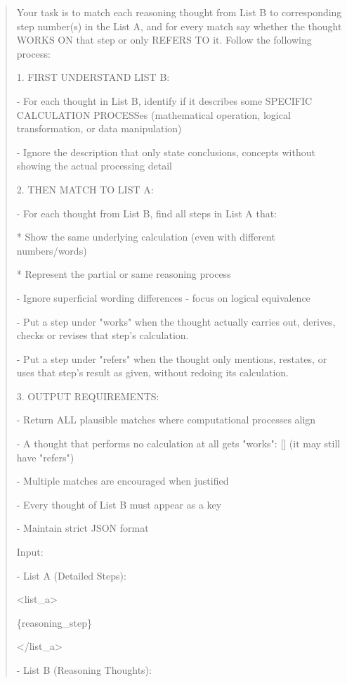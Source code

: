\begin{quote}
\footnotesize\ttfamily\raggedright
Your task is to match each reasoning thought from List B to corresponding step number(s) in the List A, and for every match say whether the thought WORKS ON that step or only REFERS TO it. Follow the following process:\par
1. FIRST UNDERSTAND LIST B:\par
   - For each thought in List B, identify if it describes some SPECIFIC CALCULATION PROCESSes (mathematical operation, logical transformation, or data manipulation)\par
   - Ignore the description that only state conclusions, concepts without showing the actual processing detail\par
2. THEN MATCH TO LIST A:\par
   - For each thought from List B, find all steps in List A that:\par
     * Show the same underlying calculation (even with different numbers/words)\par
     * Represent the partial or same reasoning process\par
   - Ignore superficial wording differences - focus on logical equivalence\par
   - Put a step under "works" when the thought actually carries out, derives, checks or revises that step's calculation.\par
   - Put a step under "refers" when the thought only mentions, restates, or uses that step's result as given, without redoing its calculation.\par
3. OUTPUT REQUIREMENTS:\par
   - Return ALL plausible matches where computational processes align\par
   - A thought that performs no calculation at all gets "works": [] (it may still have "refers")\par
   - Multiple matches are encouraged when justified\par
   - Every thought of List B must appear as a key\par
   - Maintain strict JSON format\par
Input:\par
- List A (Detailed Steps): \par
\textless{}list\_a\textgreater{}\par
\{reasoning\_step\}\par
\textless{}/list\_a\textgreater{}\par
- List B (Reasoning Thoughts): \par

\end{quote}
